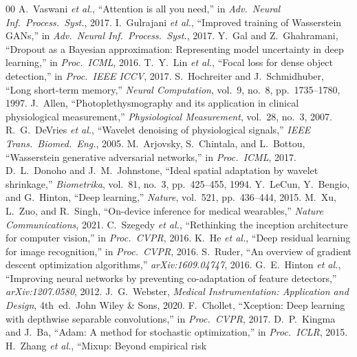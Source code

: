 \documentclass[conference]{IEEEtran}
\begin{document}
\begin{thebibliography}{00}
  A.~Vaswani \textit{et al.}, ``Attention is all you need,''
  in \textit{Adv.\ Neural Inf.\ Process.\ Syst.}, 2017.
  I.~Gulrajani \textit{et al.}, ``Improved training of
  Wasserstein GANs,'' in \textit{Adv.\ Neural Inf.\ Process.\ Syst.}, 2017.
  Y.~Gal and Z.~Ghahramani, ``Dropout as a Bayesian approximation:
  Representing model uncertainty in deep learning,''
  in \textit{Proc.\ ICML}, 2016.
  T.~Y.~Lin \textit{et al.}, ``Focal loss for dense object
  detection,'' in \textit{Proc.\ IEEE ICCV}, 2017.
  S.~Hochreiter and J.~Schmidhuber, ``Long short-term memory,''
  \textit{Neural Computation}, vol.~9, no.~8, pp.~1735--1780, 1997.
  J.~Allen, ``Photoplethysmography and its application in
  clinical physiological measurement,''
  \textit{Physiological Measurement}, vol.~28, no.~3, 2007.
  R.~G.~DeVries \textit{et al.}, ``Wavelet denoising of
  physiological signals,'' \textit{IEEE Trans.\ Biomed.\ Eng.}, 2005.
  M.~Arjovsky, S.~Chintala, and L.~Bottou, ``Wasserstein
  generative adversarial networks,'' in \textit{Proc.\ ICML}, 2017.
  D.~L.~Donoho and J.~M.~Johnstone, ``Ideal spatial adaptation
  by wavelet shrinkage,'' \textit{Biometrika}, vol.~81, no.~3,
  pp.~425--455, 1994.
 Y.~LeCun, Y.~Bengio, and G.~Hinton, ``Deep learning,''
  \textit{Nature}, vol.~521, pp.~436--444, 2015.
 M.~Xu, L.~Zuo, and R.~Singh, ``On-device inference for
  medical wearables,'' \textit{Nature Communications}, 2021.
 C.~Szegedy \textit{et al.}, ``Rethinking the inception
  architecture for computer vision,'' in \textit{Proc.\ CVPR}, 2016.
 K.~He \textit{et al.}, ``Deep residual learning for image
  recognition,'' in \textit{Proc.\ CVPR}, 2016.
 S.~Ruder, ``An overview of gradient descent optimization
  algorithms,'' \textit{arXiv:1609.04747}, 2016.
 G.~E.~Hinton \textit{et al.}, ``Improving neural networks by
  preventing co-adaptation of feature detectors,''
  \textit{arXiv:1207.0580}, 2012.
 J.~G.~Webster, \textit{Medical Instrumentation: Application and
  Design}, 4th~ed.\ John Wiley \& Sons, 2020.
 F.~Chollet, ``Xception: Deep learning with depthwise separable
  convolutions,'' in \textit{Proc.\ CVPR}, 2017.
 D.~P.~Kingma and J.~Ba, ``Adam: A method for stochastic
  optimization,'' in \textit{Proc.\ ICLR}, 2015.
 H.~Zhang \textit{et al.}, ``Mixup: Beyond empirical risk

\end{thebibliography}
\end{document}
